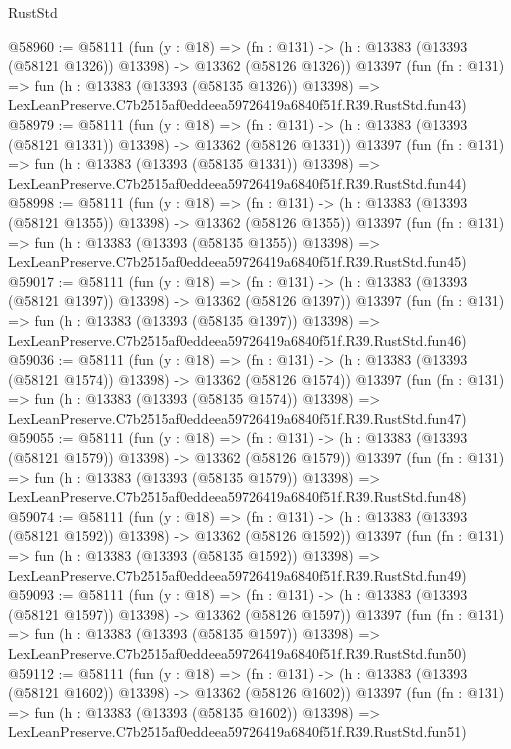 \begin{lexlean}{RustStd}
\begin{coremodule}
@58960 := @58111
    (fun (y : @18) =>
    (fn : @131) -> (h : @13383 (@13393 (@58121 @1326)) @13398) -> @13362 (@58126 @1326))
    @13397
    (fun (fn : @131) =>
    fun (h : @13383 (@13393 (@58135 @1326)) @13398) =>
    LexLeanPreserve.C7b2515af0eddeea59726419a6840f51f.R39.RustStd.fun43)
@58979 := @58111
    (fun (y : @18) =>
    (fn : @131) -> (h : @13383 (@13393 (@58121 @1331)) @13398) -> @13362 (@58126 @1331))
    @13397
    (fun (fn : @131) =>
    fun (h : @13383 (@13393 (@58135 @1331)) @13398) =>
    LexLeanPreserve.C7b2515af0eddeea59726419a6840f51f.R39.RustStd.fun44)
@58998 := @58111
    (fun (y : @18) =>
    (fn : @131) -> (h : @13383 (@13393 (@58121 @1355)) @13398) -> @13362 (@58126 @1355))
    @13397
    (fun (fn : @131) =>
    fun (h : @13383 (@13393 (@58135 @1355)) @13398) =>
    LexLeanPreserve.C7b2515af0eddeea59726419a6840f51f.R39.RustStd.fun45)
@59017 := @58111
    (fun (y : @18) =>
    (fn : @131) -> (h : @13383 (@13393 (@58121 @1397)) @13398) -> @13362 (@58126 @1397))
    @13397
    (fun (fn : @131) =>
    fun (h : @13383 (@13393 (@58135 @1397)) @13398) =>
    LexLeanPreserve.C7b2515af0eddeea59726419a6840f51f.R39.RustStd.fun46)
@59036 := @58111
    (fun (y : @18) =>
    (fn : @131) -> (h : @13383 (@13393 (@58121 @1574)) @13398) -> @13362 (@58126 @1574))
    @13397
    (fun (fn : @131) =>
    fun (h : @13383 (@13393 (@58135 @1574)) @13398) =>
    LexLeanPreserve.C7b2515af0eddeea59726419a6840f51f.R39.RustStd.fun47)
@59055 := @58111
    (fun (y : @18) =>
    (fn : @131) -> (h : @13383 (@13393 (@58121 @1579)) @13398) -> @13362 (@58126 @1579))
    @13397
    (fun (fn : @131) =>
    fun (h : @13383 (@13393 (@58135 @1579)) @13398) =>
    LexLeanPreserve.C7b2515af0eddeea59726419a6840f51f.R39.RustStd.fun48)
@59074 := @58111
    (fun (y : @18) =>
    (fn : @131) -> (h : @13383 (@13393 (@58121 @1592)) @13398) -> @13362 (@58126 @1592))
    @13397
    (fun (fn : @131) =>
    fun (h : @13383 (@13393 (@58135 @1592)) @13398) =>
    LexLeanPreserve.C7b2515af0eddeea59726419a6840f51f.R39.RustStd.fun49)
@59093 := @58111
    (fun (y : @18) =>
    (fn : @131) -> (h : @13383 (@13393 (@58121 @1597)) @13398) -> @13362 (@58126 @1597))
    @13397
    (fun (fn : @131) =>
    fun (h : @13383 (@13393 (@58135 @1597)) @13398) =>
    LexLeanPreserve.C7b2515af0eddeea59726419a6840f51f.R39.RustStd.fun50)
@59112 := @58111
    (fun (y : @18) =>
    (fn : @131) -> (h : @13383 (@13393 (@58121 @1602)) @13398) -> @13362 (@58126 @1602))
    @13397
    (fun (fn : @131) =>
    fun (h : @13383 (@13393 (@58135 @1602)) @13398) =>
    LexLeanPreserve.C7b2515af0eddeea59726419a6840f51f.R39.RustStd.fun51)

\end{coremodule}
\end{lexlean}
